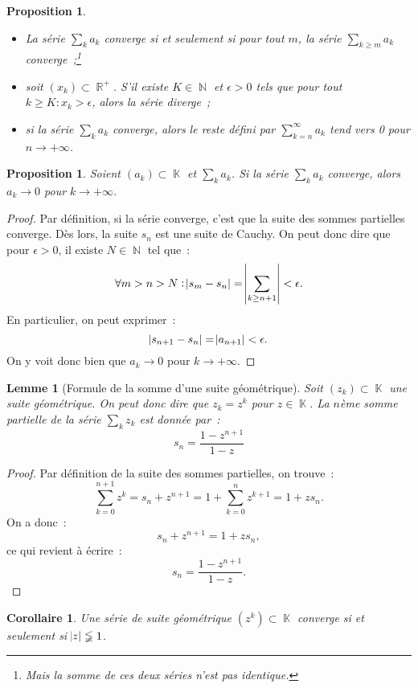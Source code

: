 \documentclass{article}
\DeclareMathOperator{\K}{\mathbb K}
\DeclareMathOperator{\N}{\mathbb N}
\DeclareMathOperator{\R}{\mathbb R}
\newcommand{\geomsum}[2]{\frac {1 - #1^{#2+1}}{1 - #1}}
\newtheorem{prp}[thm]{Proposition}
\newtheorem{cor}[thm]{Corollaire}
\newtheorem{lem}[thm]{Lemme}
\theoremstyle{definition}
\theoremstyle{remark}
\begin{document}
		\begin{prp}
		\begin{itemize}
			\item La série $\sum_k a_k$ converge si et seulement si pour tout $m$, la série $\sum_{k \geq m}a_k$ converge~;\footnote{Mais la somme de ces deux
			séries n'est pas identique.}
			\item soit $(x_k) \subset \R^+$. S'il existe $K \in \N$ et $\epsilon > 0$ tels que pour tout $k \geq K : x_k > \epsilon$, alors la série diverge~;
			\item si la série $\sum_k a_k$ converge, alors le \emph{reste} défini par $\sum_{k=n}^\infty a_k$ tend vers 0 pour $n \to +\infty$.
		\end{itemize}
		\end{prp}

		\begin{prp}\label{prp:siserieconvalorstermevers0} Soient $(a_k) \subset \K$ et $\sum_k a_k$. Si la série $\sum_k a_k$ converge, alors $a_k \to 0$ pour
		$k \to +\infty$.
		\end{prp}

		\begin{proof} Par définition, si la série converge, c'est que la suite des sommes partielles converge. Dès lors, la suite $s_n$ est une suite de Cauchy.
		On peut donc dire que pour $\epsilon > 0$, il existe $N \in \N$ tel que~:
		\[\forall m > n > N : \abs {s_m - s_n} = \abs {\sum_{k \geq n+1}} < \epsilon.\]
		En particulier, on peut exprimer~:
		\[\abs {s_{n+1} - s_n} = \abs {a_{n+1}} < \epsilon.\]
		On y voit donc bien que $a_k \to 0$ pour $k \to +\infty$.
		\end{proof}

		\begin{lem}[Formule de la somme d'une suite géométrique] Soit $(z_k) \subset \K$ une suite géométrique. On peut donc dire que $z_k = z^k$ pour
		$z \in \K$. La $n$ème somme partielle de la série $\sum_k z_k$ est donnée par~:
		\[s_n = \geomsum zn\]
		\end{lem}

		\begin{proof} Par définition de la suite des sommes partielles, on trouve~:
		\[\sum_{k=0}^{n+1}z^k = s_n + z^{n+1} = 1 + \sum_{k=0}^nz^{k+1} = 1 + zs_n.\]
		On a donc~:
		\[s_n + z^{n+1} = 1 + zs_n,\]
		ce qui revient à écrire~:
		\[s_n = \geomsum zn.\]
		\end{proof}

		\begin{cor} Une série de suite géométrique $(z^k) \subset \K$ converge si et seulement si $\abs z \lneqq 1$. \end{cor}
\end{document}
